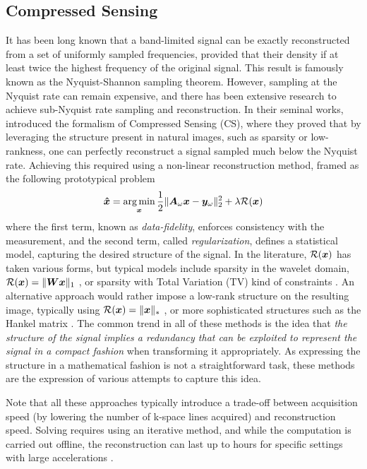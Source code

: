 \subsection{Compressed Sensing} 
It has been long known that a band-limited signal can be exactly reconstructed from a set of uniformly sampled frequencies, provided that their density if at least twice the highest frequency of the original signal. This result is famously known as the Nyquist-Shannon sampling theorem. However, sampling at the Nyquist rate can remain expensive, and there has been extensive research to achieve sub-Nyquist rate sampling and reconstruction. In their seminal works, \citet{donoho2006compressed,candes2006robust} introduced the formalism of Compressed Sensing (CS), where they proved that by leveraging the structure present in natural images, such as sparsity or low-rankness, one can perfectly reconstruct a signal sampled much below the Nyquist rate. Achieving this required using a non-linear reconstruction method, framed as the following prototypical problem
\begin{equation}
    \bm{\hat{x}} = \operatorname*{arg\,min}_{\bm{x}} \frac{1}{2}\|{\bm{A}}_\omega {\bm{x}} - {\bm{y}}_\omega\|_2^2 + \lambda \mathcal{R}({\bm{x}})\label{eq:cs}
\end{equation}
where the first term, known as \textit{data-fidelity}, enforces consistency with the measurement, and the second term, called \textit{regularization}, defines a statistical model, capturing the desired structure of the signal. In the literature, $\mathcal{R}({\bm{x}})$ has taken various forms, but typical models include sparsity in the wavelet domain, $\mathcal{R}({\bm{x}}) = \|{\bm{W}} {\bm{x}}\|_1$ \citep{candes2006robust,donoho2006compressed,lustig2007sparse}, or sparsity with Total Variation (TV) kind of constraints \citep{block2007undersampled,knoll2011second}. An alternative approach would rather impose a low-rank structure on the resulting image, typically using $\mathcal{R}({\bm{x}}) = \|{\bm{x}}\|_*$ \citep{lingala2011accelerated}, or more sophisticated structures such as the Hankel matrix \citep{jin2016general}. The common trend in all of these methods is the idea that \textit{the structure of the signal implies a redundancy that can be exploited to represent the signal in a compact fashion} when transforming it appropriately. As expressing the structure in a mathematical fashion is not a straightforward task, these methods are the expression of various attempts to capture this idea.

Note that all these approaches typically introduce a trade-off between acquisition speed (by lowering the number of k-space lines acquired) and reconstruction speed. Solving  requires using an iterative method, and while the computation is carried out offline, the reconstruction can last up to hours for specific settings with large accelerations \citep{feng2016xd}.

